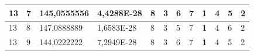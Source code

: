 \documentclass[conference]{IEEEtran}
\begin{document}
\begin{table}[]
\begin{tabular}{|llll|llllllll|}
\multicolumn{1}{|l|}{13}                                                             & \multicolumn{1}{l|}{7}                                                                 & \multicolumn{1}{l|}{145,0555556}                                                           & 4,4288E-28                              & \multicolumn{1}{l|}{8}                                                           & \multicolumn{1}{l|}{3}                                                           & \multicolumn{1}{l|}{6}                                                           & \multicolumn{1}{l|}{7}                                                           & \multicolumn{1}{l|}{\textbf{1}}                                                  & \multicolumn{1}{l|}{4}                                                           & \multicolumn{1}{l|}{5}                                                           & 2                                   \\ \hline
\multicolumn{1}{|l|}{13}                                                             & \multicolumn{1}{l|}{8}                                                                 & \multicolumn{1}{l|}{147,0888889}                                                           & 1,6583E-28                              & \multicolumn{1}{l|}{8}                                                           & \multicolumn{1}{l|}{3}                                                           & \multicolumn{1}{l|}{5}                                                           & \multicolumn{1}{l|}{7}                                                           & \multicolumn{1}{l|}{\textbf{1}}                                                  & \multicolumn{1}{l|}{4}                                                           & \multicolumn{1}{l|}{6}                                                           & 2                                   \\ \hline
\multicolumn{1}{|l|}{13}                                                             & \multicolumn{1}{l|}{9}                                                                 & \multicolumn{1}{l|}{144,0222222}                                                           & 7,2949E-28                              & \multicolumn{1}{l|}{8}                                                           & \multicolumn{1}{l|}{3}                                                           & \multicolumn{1}{l|}{6}                                                           & \multicolumn{1}{l|}{7}                                                           & \multicolumn{1}{l|}{\textbf{1}}                                                  & \multicolumn{1}{l|}{4}                                                           & \multicolumn{1}{l|}{5}                                                           & 2                                   \\ \hline

\end{tabular}
\end{table}
\end{document}
